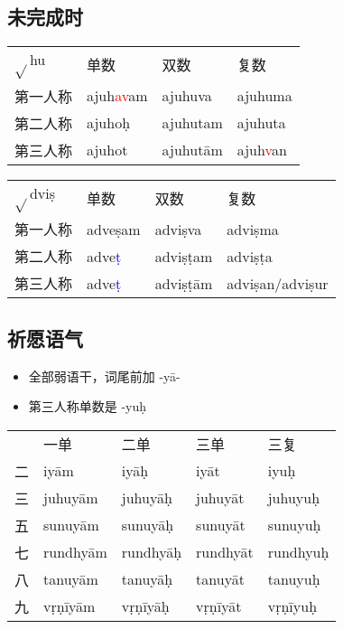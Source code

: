 \documentclass[17pt]{beamer}
\newcommand{\verbroot}[1]{{$\sqrt{#1}$}}
\begin{document}
\subsection{未完成时}
\begin{frame}{\insertsubsection}
  \small
  \raggedright  
  \begin{tabular}{@{}llll@{}} %
    \verbroot{}hu & 单数  & 双数  & 复数 \\
    第一人称 & \cellcolor{light-gray}ajuh\textcolor{red}{av}am & ajuhuva  & ajuhuma  \\
    第二人称 & \cellcolor{light-gray}ajuhoḥ & ajuhutam & ajuhuta  \\
    第三人称 & \cellcolor{light-gray}ajuhot & ajuhutām & ajuh\textcolor{red}{v}an  \\
  \end{tabular} 
  \bigskip
    
  \begin{tabular}{@{}llll@{}} %
    \verbroot{}dviṣ & 单数  & 双数  & 复数 \\
    第一人称 & \cellcolor{light-gray}adveṣam & adviṣva & adviṣma \\
    第二人称 & \cellcolor{light-gray}adve\textcolor{blue}{ṭ} & adviṣṭam & adviṣṭa \\
    第三人称 & \cellcolor{light-gray}adve\textcolor{blue}{ṭ} & adviṣṭām & adviṣ\textcolor{OliveGreen}{an}/adviṣ\textcolor{OliveGreen}{ur} \\
  \end{tabular}   
\end{frame}

\subsection{祈愿语气}
\begin{frame}{\insertsubsection}
  \small
  \begin{itemize}
    \item 全部弱语干，词尾前加 \nobreakdash-yā\nobreakdash-
    \item 第三人称单数是 \nobreakdash-yuḥ
  \end{itemize}
  \centering
  \begin{tabular}{@{}lllll@{}} %
    & 一单  & 二单 & 三单 & 三复 \\
    二 & iyām & iyāḥ & iyāt  & iyuḥ  \\
    三 & juhuyām & juhuyāḥ & juhuyāt & juhuyuḥ  \\
    五 & sunuyām & sunuyāḥ & sunuyāt & sunuyuḥ  \\
    七 & rundhyām & rundhyāḥ & rundhyāt & rundhyuḥ  \\
    八 & tanuyām & tanuyāḥ & tanuyāt & tanuyuḥ  \\
    九 & vṛṇīyām & vṛṇīyāḥ & vṛṇīyāt & vṛṇīyuḥ  \\
  \end{tabular}   
\end{frame}
\end{document}
